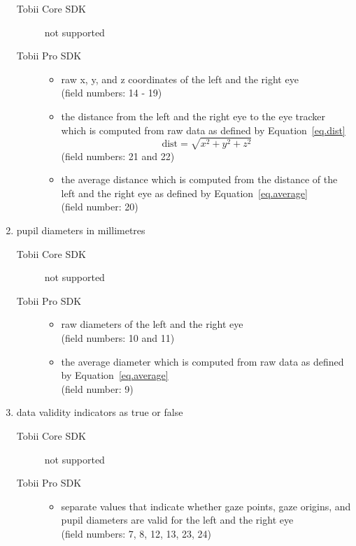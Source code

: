\documentclass[a4paper,oneside]{book}
\begin{document}
\begin{enumerate}
        \begin{description}
            \item[Tobii Core SDK] not supported
            \item[Tobii Pro SDK] \hfill
                \begin{itemize}
                    \item raw x, y, and z coordinates of the left and the right eye\\
                        (field numbers: 14 - 19)
                    \item the distance from the left and the right eye to the eye tracker which is computed from raw data as defined by Equation~\ref{eq.dist}\\
\begin{equation}
    \label{eq.dist}
    \text{dist} = \sqrt{x^2 + y^2 + z^2}
\end{equation}
                        (field numbers: 21 and 22)
                    \item the average distance which is computed from the distance of the left and the right eye as defined by Equation~\ref{eq.average}\\
                        (field number: 20)
                \end{itemize}
        \end{description}
    \item pupil diameters in millimetres
        \begin{description}
            \item[Tobii Core SDK] not supported
            \item[Tobii Pro SDK] \hfill
                \begin{itemize}
                    \item raw diameters of the left and the right eye\\
                        (field numbers: 10 and 11)
                    \item the average diameter which is computed from raw data as defined by Equation~\ref{eq.average}\\
                        (field number: 9)
                \end{itemize}
        \end{description}
    \item data validity indicators as true or false
        \begin{description}
            \item[Tobii Core SDK] not supported
            \item[Tobii Pro SDK] \hfill
                \begin{itemize}
                    \item separate values that indicate whether gaze points, gaze origins, and pupil diameters are valid for the left and the right eye\\
                        (field numbers: 7, 8, 12, 13, 23, 24)
                \end{itemize}
        \end{description}
\end{enumerate}
\end{document}
